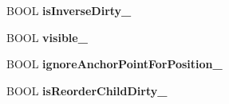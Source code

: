 \begin{DoxyCompactItemize}
\item 
\hypertarget{class_c_c_node_aa80caf16882ced4ad4821ad2412015cf}{B\-O\-O\-L {\bfseries is\-Inverse\-Dirty\-\_\-}}\label{class_c_c_node_aa80caf16882ced4ad4821ad2412015cf}

\item 
\hypertarget{class_c_c_node_aee9fb6951aa83a856d3e713c9f91e1bc}{B\-O\-O\-L {\bfseries visible\-\_\-}}\label{class_c_c_node_aee9fb6951aa83a856d3e713c9f91e1bc}

\item 
\hypertarget{class_c_c_node_a3d4ea139055d399c2d26d43fe114c189}{B\-O\-O\-L {\bfseries ignore\-Anchor\-Point\-For\-Position\-\_\-}}\label{class_c_c_node_a3d4ea139055d399c2d26d43fe114c189}

\item 
\hypertarget{class_c_c_node_af434207c26f927da55e76558b30ff493}{B\-O\-O\-L {\bfseries is\-Reorder\-Child\-Dirty\-\_\-}}\label{class_c_c_node_af434207c26f927da55e76558b30ff493}

\end{DoxyCompactItemize}
